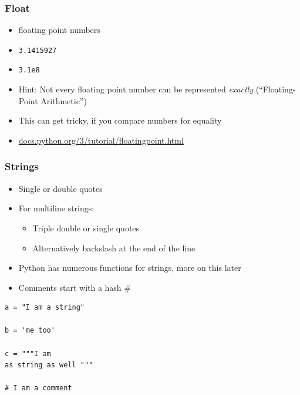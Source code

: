 \documentclass[english]{beamer}
\begin{document}
\begin{frame}
\frametitle{Float}

\begin{itemize}
	\item floating point numbers
	\item \texttt{3.1415927}
	\item \texttt{3.1e8}
	\item Hint: Not every floating point number can be represented \textit{exactly} (\enquote{Floating-Point Arithmetic}) 
	\item This can get tricky, if you compare numbers for equality
	\item \url{docs.python.org/3/tutorial/floatingpoint.html}

\end{itemize}
\end{frame}

\begin{frame}[containsverbatim]
\frametitle{Strings}

\begin{itemize}
\item Single or double quotes
\item For multiline strings:

\begin{itemize}
	\item Triple double or single quotes
	\item Alternatively backslash at the end of the line 
\end{itemize}

\item Python has numerous functions for strings, more on this later
\item Comments start with a hash \#
\end{itemize}


\begin{lstlisting}[style=Python]
a = "I am a string"

b = 'me too'

c = """I am 
as string as well """

# I am a comment
\end{lstlisting}


\end{frame}
\end{document}
